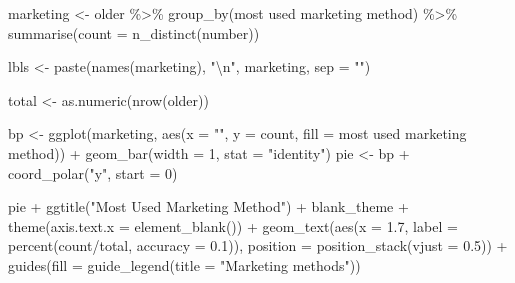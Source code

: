 \documentclass[
]{article}
\newenvironment{Shaded}{\begin{snugshade}}{\end{snugshade}}
\newcommand{\AttributeTok}[1]{\textcolor[rgb]{0.77,0.63,0.00}{#1}}
\newcommand{\DecValTok}[1]{\textcolor[rgb]{0.00,0.00,0.81}{#1}}
\newcommand{\FloatTok}[1]{\textcolor[rgb]{0.00,0.00,0.81}{#1}}
\newcommand{\FunctionTok}[1]{\textcolor[rgb]{0.00,0.00,0.00}{#1}}
\newcommand{\NormalTok}[1]{#1}
\newcommand{\OtherTok}[1]{\textcolor[rgb]{0.56,0.35,0.01}{#1}}
\newcommand{\SpecialCharTok}[1]{\textcolor[rgb]{0.00,0.00,0.00}{#1}}
\newcommand{\StringTok}[1]{\textcolor[rgb]{0.31,0.60,0.02}{#1}}
\begin{document}
\begin{Shaded}
\begin{Highlighting}[]
\NormalTok{marketing }\OtherTok{\textless{}{-}}\NormalTok{ older }\SpecialCharTok{\%\textgreater{}\%}
    \FunctionTok{group\_by}\NormalTok{(}\StringTok{\textasciigrave{}}\AttributeTok{most used marketing method}\StringTok{\textasciigrave{}}\NormalTok{) }\SpecialCharTok{\%\textgreater{}\%}
    \FunctionTok{summarise}\NormalTok{(}\AttributeTok{count =} \FunctionTok{n\_distinct}\NormalTok{(number))}

\NormalTok{lbls }\OtherTok{\textless{}{-}} \FunctionTok{paste}\NormalTok{(}\FunctionTok{names}\NormalTok{(marketing), }\StringTok{"}\SpecialCharTok{\textbackslash{}n}\StringTok{"}\NormalTok{, marketing, }\AttributeTok{sep =} \StringTok{""}\NormalTok{)}

\NormalTok{total }\OtherTok{\textless{}{-}} \FunctionTok{as.numeric}\NormalTok{(}\FunctionTok{nrow}\NormalTok{(older))}

\NormalTok{bp }\OtherTok{\textless{}{-}} \FunctionTok{ggplot}\NormalTok{(marketing, }\FunctionTok{aes}\NormalTok{(}\AttributeTok{x =} \StringTok{""}\NormalTok{, }\AttributeTok{y =}\NormalTok{ count, }\AttributeTok{fill =} \StringTok{\textasciigrave{}}\AttributeTok{most used marketing method}\StringTok{\textasciigrave{}}\NormalTok{)) }\SpecialCharTok{+}
    \FunctionTok{geom\_bar}\NormalTok{(}\AttributeTok{width =} \DecValTok{1}\NormalTok{, }\AttributeTok{stat =} \StringTok{"identity"}\NormalTok{)}
\NormalTok{pie }\OtherTok{\textless{}{-}}\NormalTok{ bp }\SpecialCharTok{+} \FunctionTok{coord\_polar}\NormalTok{(}\StringTok{"y"}\NormalTok{, }\AttributeTok{start =} \DecValTok{0}\NormalTok{)}

\NormalTok{pie }\SpecialCharTok{+} \FunctionTok{ggtitle}\NormalTok{(}\StringTok{"Most Used Marketing Method"}\NormalTok{) }\SpecialCharTok{+}\NormalTok{ blank\_theme }\SpecialCharTok{+} \FunctionTok{theme}\NormalTok{(}\AttributeTok{axis.text.x =} \FunctionTok{element\_blank}\NormalTok{()) }\SpecialCharTok{+}
    \FunctionTok{geom\_text}\NormalTok{(}\FunctionTok{aes}\NormalTok{(}\AttributeTok{x =} \FloatTok{1.7}\NormalTok{, }\AttributeTok{label =} \FunctionTok{percent}\NormalTok{(count}\SpecialCharTok{/}\NormalTok{total, }\AttributeTok{accuracy =} \FloatTok{0.1}\NormalTok{)),}
        \AttributeTok{position =} \FunctionTok{position\_stack}\NormalTok{(}\AttributeTok{vjust =} \FloatTok{0.5}\NormalTok{)) }\SpecialCharTok{+} \FunctionTok{guides}\NormalTok{(}\AttributeTok{fill =} \FunctionTok{guide\_legend}\NormalTok{(}\AttributeTok{title =} \StringTok{"Marketing methods"}\NormalTok{))}
\end{Highlighting}
\end{Shaded}
\end{document}
